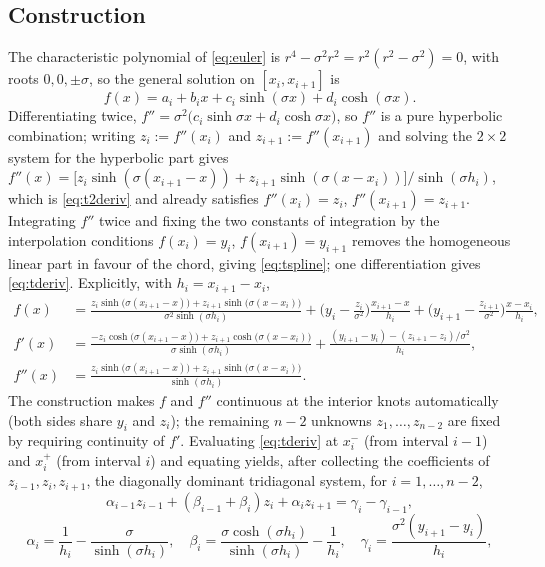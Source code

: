 \documentclass[10pt]{article}
\begin{document}
\subsection{Construction}
The characteristic polynomial of \eqref{eq:euler} is $r^4-\sigma^2 r^2=r^2(r^2-\sigma^2)=0$,
with roots $0,0,\pm\sigma$, so the general solution on $[x_i,x_{i+1}]$ is
\[
f(x)=a_i+b_i x+c_i\sinh(\sigma x)+d_i\cosh(\sigma x).
\]
Differentiating twice, $f''=\sigma^2\big(c_i\sinh\sigma x+d_i\cosh\sigma x\big)$, so $f''$ is a
pure hyperbolic combination; writing $z_i:=f''(x_i)$ and $z_{i+1}:=f''(x_{i+1})$ and solving the
$2\times2$ system for the hyperbolic part gives
$f''(x)=\big[z_i\sinh(\sigma(x_{i+1}-x))+z_{i+1}\sinh(\sigma(x-x_i))\big]/\sinh(\sigma h_i)$,
which is \eqref{eq:t2deriv} and already satisfies $f''(x_i)=z_i$, $f''(x_{i+1})=z_{i+1}$.
Integrating $f''$ twice and fixing the two constants of integration by the interpolation
conditions $f(x_i)=y_i$, $f(x_{i+1})=y_{i+1}$ removes the homogeneous linear part in favour of
the chord, giving \eqref{eq:tspline}; one differentiation gives \eqref{eq:tderiv}. Explicitly,
with $h_i=x_{i+1}-x_i$,
\begin{align}
f(x)&=\frac{z_i\sinh\!\big(\sigma(x_{i+1}-x)\big)+z_{i+1}\sinh\!\big(\sigma(x-x_i)\big)}
{\sigma^2\sinh(\sigma h_i)}
+\Big(y_i-\tfrac{z_i}{\sigma^2}\Big)\frac{x_{i+1}-x}{h_i}
+\Big(y_{i+1}-\tfrac{z_{i+1}}{\sigma^2}\Big)\frac{x-x_i}{h_i},\label{eq:tspline}\\[2pt]
f'(x)&=\frac{-z_i\cosh\!\big(\sigma(x_{i+1}-x)\big)+z_{i+1}\cosh\!\big(\sigma(x-x_i)\big)}
{\sigma\sinh(\sigma h_i)}
+\frac{(y_{i+1}-y_i)-(z_{i+1}-z_i)/\sigma^2}{h_i},\label{eq:tderiv}\\[2pt]
f''(x)&=\frac{z_i\sinh\!\big(\sigma(x_{i+1}-x)\big)+z_{i+1}\sinh\!\big(\sigma(x-x_i)\big)}
{\sinh(\sigma h_i)}.\label{eq:t2deriv}
\end{align}
The construction makes $f$ and $f''$ continuous at the interior knots automatically (both sides
share $y_i$ and $z_i$); the remaining $n-2$ unknowns $z_1,\dots,z_{n-2}$ are fixed by requiring
continuity of $f'$. Evaluating \eqref{eq:tderiv} at $x_i^{-}$ (from interval $i-1$) and $x_i^{+}$
(from interval $i$) and equating yields, after collecting the coefficients of $z_{i-1},z_i,z_{i+1}$,
the diagonally dominant tridiagonal system, for $i=1,\dots,n-2$,
\begin{equation}
\alpha_{i-1}z_{i-1}+(\beta_{i-1}+\beta_i)z_i+\alpha_i z_{i+1}=\gamma_i-\gamma_{i-1},
\label{eq:ttridiag}
\end{equation}
\begin{equation}
\alpha_i=\frac{1}{h_i}-\frac{\sigma}{\sinh(\sigma h_i)},\quad
\beta_i=\frac{\sigma\cosh(\sigma h_i)}{\sinh(\sigma h_i)}-\frac{1}{h_i},\quad
\gamma_i=\frac{\sigma^2(y_{i+1}-y_i)}{h_i},
\end{equation}
\end{document}
